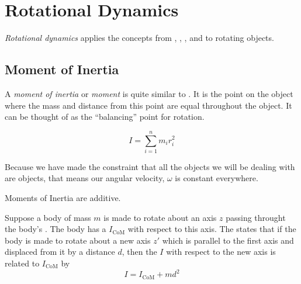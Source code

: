 \section{Rotational Dynamics} \label{sec:Rotational Dynamics}
\emph{Rotational dynamics} applies the concepts from , , , and  to rotating objects.

\subsection{Moment of Inertia} \label{subsec:Moment of Inertia}
\begin{definition} \label{def:Moment of Inertia}
  A \emph{moment of inertia} or \emph{moment} is quite similar to .
  It is the point on the object where the mass and distance from this point are equal throughout the object.
  It can be thought of as the ``balancing'' point for rotation.

  \begin{equation} \label{eq:Moment of Inertia}
    I = \sum\limits_{i=1}^{n} m_{i} r_{i}^{2}
  \end{equation}

  \begin{remark}
    Because we have made the constraint that all the objects we will be dealing with are  objects, that means our angular velocity, $\omega$ is constant everywhere.
  \end{remark}
  \begin{remark}
    Moments of Inertia are additive.
  \end{remark}
\end{definition}

\begin{theorem} \label{thm:Parallel Axis Theorem}
  Suppose a body of mass $m$ is made to rotate about an axis $z$ passing throught the body's .
  The body has a  $I_{\text{CoM}}$ with respect to this axis.
  The  states that if the body is made to rotate about a new axis $z'$ which is parallel to the first axis and displaced from it by a distance $d$, then the  $I$ with respect to the new axis is related to $I_{\text{CoM}}$ by
  \begin{equation} \label{eq:Parallel Axis Theorem}
    I = I_{\text{CoM}} + md^{2}
  \end{equation}
\end{theorem}

